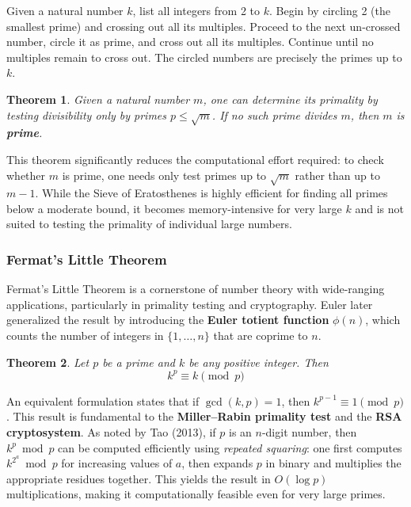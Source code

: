 \documentclass[11pt]{article}
\theoremstyle{plain}
\newtheorem{theorem}{Theorem}
\theoremstyle{definition}
\theoremstyle{remark}
\newcommand{\fermlt}{k^{p} \equiv k \pmod{p}}
\begin{document}
\par Given a natural number $k$, list all integers from 2 to $k$. Begin by circling 2 (the smallest prime) and crossing out all its multiples. Proceed to the next un-crossed number, circle it as prime, and cross out all its multiples. Continue until no multiples remain to cross out. The circled numbers are precisely the primes up to $k$.

\begin{theorem}
	\label{thm:zsathm}
	Given a natural number $m$, one can determine its primality by testing divisibility only by primes $p \leq \sqrt{m}$. If no such prime divides $m$, then $m$ is \textbf{prime}.
\end{theorem}

\par This theorem significantly reduces the computational effort required: to check whether $m$ is prime, one needs only test primes up to $\sqrt{m}$ rather than up to $m - 1$. While the Sieve of Eratosthenes is highly efficient for finding all primes below a moderate bound, it becomes memory-intensive for very large $k$ and is not suited to testing the primality of individual large numbers.

\subsubsection{Fermat's Little Theorem}

\par Fermat's Little Theorem is a cornerstone of number theory with wide-ranging applications, particularly in primality testing and cryptography. Euler later generalized the result by introducing the \textbf{Euler totient function} $\phi(n)$, which counts the number of integers in $\{1, \ldots, n\}$ that are coprime to $n$.

\begin{theorem}
	\label{thm:frmthm}
	Let $p$ be a prime and $k$ be any positive integer. Then
	$$\fermlt$$ \cite{weisstein_fermat_little,ireland_rosen_1990}
\end{theorem}

\par An equivalent formulation states that if $\gcd(k, p) = 1$, then $k^{p-1} \equiv 1 \pmod{p}$. This result is fundamental to the \textbf{Miller--Rabin primality test} and the \textbf{RSA cryptosystem}. As noted by Tao (2013), if $p$ is an $n$-digit number, then $k^p \bmod p$ can be computed efficiently using \textit{repeated squaring}: one first computes $k^{2^a} \bmod p$ for increasing values of $a$, then expands $p$ in binary and multiplies the appropriate residues together. This yields the result in $O(\log p)$ multiplications, making it computationally feasible even for very large primes.
\end{document}
